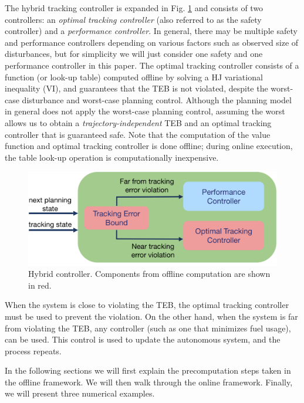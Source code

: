 The hybrid tracking controller is expanded in Fig. \ref{fig:hybrid_ctrl} and consists of two controllers: an \textit{optimal tracking controller }(also referred to as the safety controller) and a \textit{performance controller}.
In general, there may be multiple safety and performance controllers depending on various factors such as observed size of disturbances, but for simplicity we will just consider one safety and one performance controller in this paper. 
The optimal tracking controller consists of a function (or look-up table) computed offline by solving a HJ variational inequality (VI), and guarantees that the TEB is not violated, despite the worst-case disturbance and worst-case planning control. 
Although the planning model in general does not apply the worst-case planning control, assuming the worst allows us to obtain a \textit{trajectory-independent} TEB and an optimal tracking controller that is guaranteed safe.
Note that the computation of the value function and optimal tracking controller is done offline; during online execution, the table look-up operation is computationally inexpensive. 
\begin{figure}[h!]
	\centering
	\includegraphics[width=\columnwidth]{fig/hybrid_controller_2}
	\caption{Hybrid controller. Components from offline computation are shown in red.}
	\label{fig:hybrid_ctrl}
\end{figure}

When the system is close to violating the TEB, the optimal tracking controller must be used to prevent the violation. 
On the other hand, when the system is far from violating the TEB, any controller (such as one that minimizes fuel usage), can be used. 
This control is used to update the autonomous system, and the process repeats.

In the following sections we will first explain the precomputation steps taken in the offline framework. 
We will then walk through the online framework.
Finally, we will present three numerical examples.

